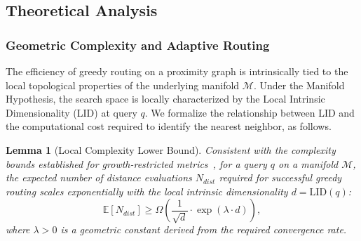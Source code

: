 \documentclass{article}
\theoremstyle{plain}
\newtheorem{lemma}[theorem]{Lemma}
\theoremstyle{definition}
\theoremstyle{remark}
\newtheorem{remark}[theorem]{Remark}
\begin{document}

\subsection{Theoretical Analysis}
\label{sec:theory}

\subsubsection{Geometric Complexity and Adaptive Routing}
\label{subsec:geometric_complexity}

The efficiency of greedy routing on a proximity graph is intrinsically tied to the local topological properties of the underlying manifold $\mathcal{M}$. Under the Manifold Hypothesis, the search space is locally characterized by the Local Intrinsic Dimensionality (LID) at query $q$. 
We formalize the relationship between LID and the computational cost required to identify the nearest neighbor, as follows.

\begin{lemma}[Local Complexity Lower Bound]
\label{lemma:complexity}
Consistent with the complexity bounds established for growth-restricted metrics~\cite{karger2002finding}, for a query $q$ on a manifold $\mathcal{M}$, the expected number of distance evaluations $N_{dist}$ required for successful greedy routing scales exponentially with the local intrinsic dimensionality $d = \text{LID}(q)$:
\begin{equation}
    \mathbb{E}[N_{dist}] \ge \Omega\left( \frac{1}{\sqrt{d}} \cdot \exp(\lambda \cdot d) \right),
\end{equation}
where $\lambda > 0$ is a geometric constant derived from the required convergence rate.
\end{lemma}
\end{document}
